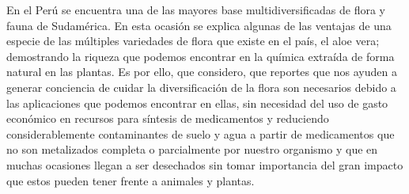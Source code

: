 

En el Perú se encuentra una de las mayores base multidiversificadas de flora y fauna de Sudamérica. En esta ocasión se explica algunas de las ventajas de una especie de las múltiples variedades de flora que existe en el país, el aloe vera; demostrando la riqueza que podemos encontrar en la química extraída de forma natural en las plantas. Es por ello, que considero, que reportes que nos ayuden a generar conciencia de cuidar la diversificación de la flora son necesarios debido a las aplicaciones que podemos encontrar en ellas, sin necesidad del uso de gasto económico en recursos para síntesis de medicamentos y reduciendo considerablemente contaminantes de suelo y agua a partir de medicamentos que no son metalizados completa o parcialmente por nuestro organismo y que en muchas ocasiones llegan a ser desechados  sin tomar importancia del gran impacto que estos pueden tener frente a animales y plantas.

